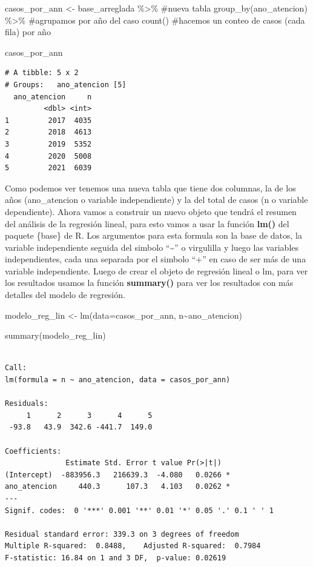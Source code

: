 \documentclass[
  letterpaper,
  DIV=11,
  numbers=noendperiod]{scrreprt}
\newenvironment{Shaded}{\begin{snugshade}}{\end{snugshade}}
\newcommand{\AttributeTok}[1]{\textcolor[rgb]{0.40,0.45,0.13}{#1}}
\newcommand{\CommentTok}[1]{\textcolor[rgb]{0.37,0.37,0.37}{#1}}
\newcommand{\FunctionTok}[1]{\textcolor[rgb]{0.28,0.35,0.67}{#1}}
\newcommand{\NormalTok}[1]{\textcolor[rgb]{0.00,0.23,0.31}{#1}}
\newcommand{\OtherTok}[1]{\textcolor[rgb]{0.00,0.23,0.31}{#1}}
\newcommand{\SpecialCharTok}[1]{\textcolor[rgb]{0.37,0.37,0.37}{#1}}
\begin{document}
\begin{Shaded}
\begin{Highlighting}[]
\NormalTok{casos\_por\_ann }\OtherTok{\textless{}{-}}\NormalTok{ base\_arreglada }\SpecialCharTok{\%\textgreater{}\%} \CommentTok{\#nueva tabla}
  \FunctionTok{group\_by}\NormalTok{(ano\_atencion) }\SpecialCharTok{\%\textgreater{}\%}        \CommentTok{\#agrupamos por año del caso}
  \FunctionTok{count}\NormalTok{()                           }\CommentTok{\#hacemos un conteo de casos (cada fila) por año}


\NormalTok{casos\_por\_ann}
\end{Highlighting}
\end{Shaded}

\begin{verbatim}
# A tibble: 5 x 2
# Groups:   ano_atencion [5]
  ano_atencion     n
         <dbl> <int>
1         2017  4035
2         2018  4613
3         2019  5352
4         2020  5008
5         2021  6039
\end{verbatim}

Como podemos ver tenemos una nueva tabla que tiene dos columnas, la de
los años (ano\_atencion o variable independiente) y la del total de
casos (n o variable dependiente). Ahora vamos a construir un nuevo
objeto que tendrá el resumen del análisis de la regresión lineal, para
esto vamos a usar la función \textbf{lm()} del paquete \{base\} de R.
Los argumentos para esta formula son la base de datos, la variable
independiente seguida del simbolo ``\textasciitilde{}'' o virgulilla y
luego las variables independientes, cada una separada por el simbolo
``+'' en caso de ser más de una variable independiente. Luego de crear
el objeto de regresión lineal o lm, para ver los resultados usamos la
función \textbf{summary()} para ver los resultados con más detalles del
modelo de regresión.

\begin{Shaded}
\begin{Highlighting}[]
\NormalTok{modelo\_reg\_lin }\OtherTok{\textless{}{-}} \FunctionTok{lm}\NormalTok{(}\AttributeTok{data=}\NormalTok{casos\_por\_ann, n}\SpecialCharTok{\textasciitilde{}}\NormalTok{ano\_atencion) }

\FunctionTok{summary}\NormalTok{(modelo\_reg\_lin)}
\end{Highlighting}
\end{Shaded}

\begin{verbatim}

Call:
lm(formula = n ~ ano_atencion, data = casos_por_ann)

Residuals:
     1      2      3      4      5 
 -93.8   43.9  342.6 -441.7  149.0 

Coefficients:
              Estimate Std. Error t value Pr(>|t|)  
(Intercept)  -883956.3   216639.3  -4.080   0.0266 *
ano_atencion     440.3      107.3   4.103   0.0262 *
---
Signif. codes:  0 '***' 0.001 '**' 0.01 '*' 0.05 '.' 0.1 ' ' 1

Residual standard error: 339.3 on 3 degrees of freedom
Multiple R-squared:  0.8488,    Adjusted R-squared:  0.7984 
F-statistic: 16.84 on 1 and 3 DF,  p-value: 0.02619
\end{verbatim}
\end{document}
